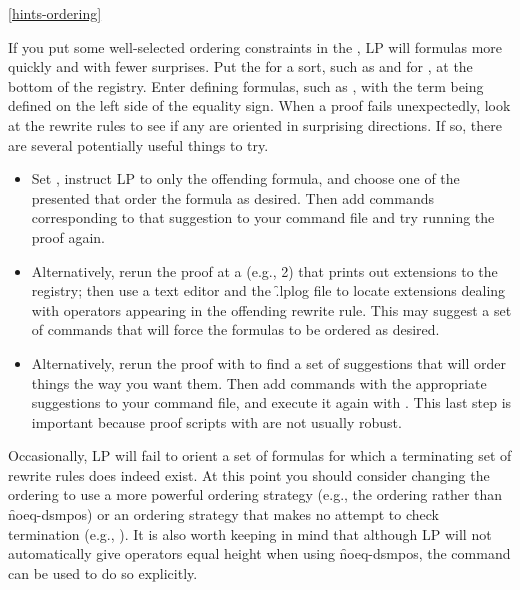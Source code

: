 \ref{hints-ordering}

If you put some well-selected ordering constraints in the
, LP will
 formulas more quickly and with fewer 
surprises.  Put the  for a sort, such as
 and  for , at the bottom of the registry.  Enter
defining formulas, such as , with the term being
defined on the left side of the equality sign.
\p
When a proof fails unexpectedly, look at the rewrite rules to see if any are
oriented in surprising directions.  If so, there are several potentially useful
things to try.

\begin{itemize}
\item
Set  , instruct LP to  only
the offending formula, and choose one of the presented
 that order the formula as desired.
Then add  commands corresponding to that suggestion to your
command file and try running the proof again.
\p
\item
Alternatively, rerun the proof at a  (e.g., 2) that prints
out extensions to the registry; then use a text editor and the \f{.lplog} file
to locate extensions dealing with operators appearing in the offending rewrite
rule.  This may suggest a set of  commands that will force the
formulas to be ordered as desired.
\p
\item
Alternatively, rerun the proof with   to
find a set of suggestions that will order things the way you want them.  Then
add  commands with the appropriate suggestions to your command
file, and execute it again with  .  This
last step is important because proof scripts with 
 are not usually robust.
\end{itemize}

Occasionally, LP will fail to orient a set of formulas for which a terminating
set of rewrite rules does indeed exist.  At this point you should consider
changing the ordering to use a more powerful ordering strategy (e.g., the
 ordering rather than  \f{noeq-dsmpos}) or 
an ordering strategy that makes no attempt to check termination (e.g.,
).  It is also worth keeping in
mind that although LP will not automatically give operators equal height when
using \f{noeq-dsmpos}, the  command can be used to do so
explicitly.
